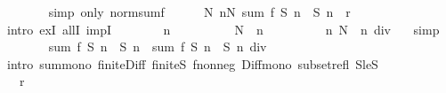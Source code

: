 \begin{isabellebody}
\ \ \ \ \ \ \isamarkupfalse%
\ {\isacharparenleft}{\kern0pt}simp\ only{\isacharcolon}{\kern0pt}\ norm{\isacharunderscore}{\kern0pt}sum{\isacharunderscore}{\kern0pt}f{\isacharparenright}{\kern0pt}\isanewline
\ \ \ \ \isamarkupfalse%
\ {\isachardoublequoteopen}{\isasymexists}N{\isachardot}{\kern0pt}\ {\isasymforall}n{\isasymge}N{\isachardot}{\kern0pt}\ sum\ {\isacharquery}{\kern0pt}f\ {\isacharparenleft}{\kern0pt}{\isacharquery}{\kern0pt}S{}\ n\ {\isacharminus}{\kern0pt}\ {\isacharquery}{\kern0pt}S{}\ n{\isacharparenright}{\kern0pt}\ {\isacharless}{\kern0pt}\ r{\isachardoublequoteclose}\isanewline
\ \ \ \ \isamarkupfalse%
\ {\isacharparenleft}{\kern0pt}intro\ exI\ allI\ impI{\isacharparenright}{\kern0pt}\isanewline
\ \ \ \ \ \ \isamarkupfalse%
\ n\isanewline
\ \ \ \ \ \ \isamarkupfalse%
\ {\isachardoublequoteopen}{}\ {\isacharasterisk}{\kern0pt}\ N\ {\isasymle}\ n{\isachardoublequoteclose}\isanewline
\ \ \ \ \ \ \isamarkupfalse%
\ \isamarkupfalse%
\ n{\isacharcolon}{\kern0pt}\ {\isachardoublequoteopen}N\ {\isasymle}\ n\ div\ {}{\isachardoublequoteclose}\ \isamarkupfalse%
\ simp\isanewline
\ \ \ \ \ \ \isamarkupfalse%
\ {\isachardoublequoteopen}sum\ {\isacharquery}{\kern0pt}f\ {\isacharparenleft}{\kern0pt}{\isacharquery}{\kern0pt}S{}\ n\ {\isacharminus}{\kern0pt}\ {\isacharquery}{\kern0pt}S{}\ n{\isacharparenright}{\kern0pt}\ {\isasymle}\ sum\ {\isacharquery}{\kern0pt}f\ {\isacharparenleft}{\kern0pt}{\isacharquery}{\kern0pt}S{}\ n\ {\isacharminus}{\kern0pt}\ {\isacharquery}{\kern0pt}S{}\ {\isacharparenleft}{\kern0pt}n\ div\ {}{\isacharparenright}{\kern0pt}{\isacharparenright}{\kern0pt}{\isachardoublequoteclose}\isanewline
\ \ \ \ \ \ \ \ \isamarkupfalse%
\ {\isacharparenleft}{\kern0pt}intro\ sum{\isacharunderscore}{\kern0pt}mono{}\ finite{\isacharunderscore}{\kern0pt}Diff\ finite{\isacharunderscore}{\kern0pt}S{}\ f{\isacharunderscore}{\kern0pt}nonneg\ Diff{\isacharunderscore}{\kern0pt}mono\ subset{\isacharunderscore}{\kern0pt}refl\ S{}{\isacharunderscore}{\kern0pt}le{\isacharunderscore}{\kern0pt}S{}{\isacharparenright}{\kern0pt}\isanewline
\ \ \ \ \ \ \isamarkupfalse%
\ \isamarkupfalse%
\ {\isachardoublequoteopen}{\isasymdots}\ {\isacharless}{\kern0pt}\ r{\isachardoublequoteclose}\isanewline
\ \ \ \ \ \ \ \ \isamarkupfalse%

\end{isabellebody}
